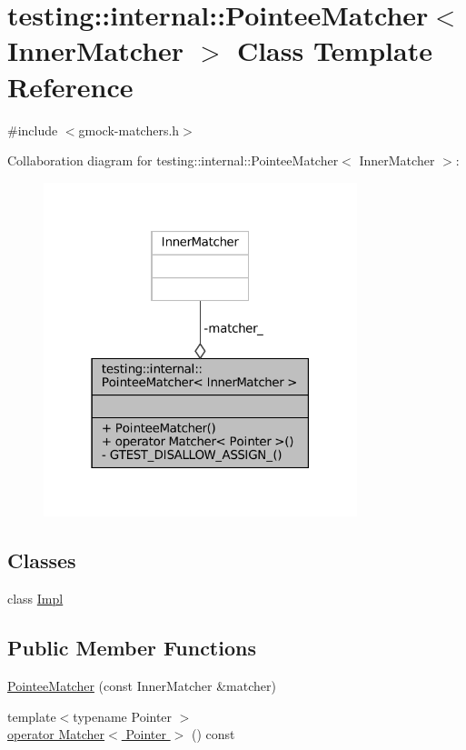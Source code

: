 \hypertarget{classtesting_1_1internal_1_1PointeeMatcher}{}\section{testing\+:\+:internal\+:\+:Pointee\+Matcher$<$ Inner\+Matcher $>$ Class Template Reference}
\label{classtesting_1_1internal_1_1PointeeMatcher}


{\ttfamily \#include $<$gmock-\/matchers.\+h$>$}



Collaboration diagram for testing\+:\+:internal\+:\+:Pointee\+Matcher$<$ Inner\+Matcher $>$\+:
\nopagebreak
\begin{figure}[H]
\begin{center}
\leavevmode
\includegraphics[width=259pt]{classtesting_1_1internal_1_1PointeeMatcher__coll__graph}
\end{center}
\end{figure}
\subsection*{Classes}
\begin{DoxyCompactItemize}
\item 
class \hyperlink{classtesting_1_1internal_1_1PointeeMatcher_1_1Impl}{Impl}
\end{DoxyCompactItemize}
\subsection*{Public Member Functions}
\begin{DoxyCompactItemize}
\item 
\hyperlink{classtesting_1_1internal_1_1PointeeMatcher_ad9f7d9dbd115c50811ce82ba27f1ba56}{Pointee\+Matcher} (const Inner\+Matcher \&matcher)
\item 
{\footnotesize template$<$typename Pointer $>$ }\\\hyperlink{classtesting_1_1internal_1_1PointeeMatcher_adec012cd8d3fa166ee89236545a57772}{operator Matcher$<$ Pointer $>$} () const
\end{DoxyCompactItemize}
